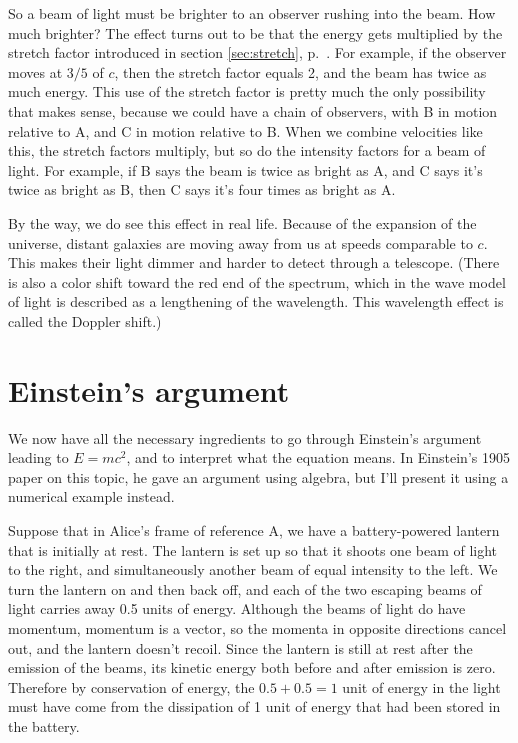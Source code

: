 So a beam of light must be brighter to an observer rushing into the beam. How much brighter?
The effect turns out to be that the energy gets multiplied by the stretch factor introduced
in section \ref{sec:stretch}, p.~\pageref{sec:stretch}. For example, if the observer moves at $3/5$ of
$c$, then the stretch factor equals 2, and the beam has twice as much energy. This use of the stretch
factor is pretty much the only possibility that makes sense, because we could have a chain of observers,
with B in motion relative to A, and C in motion relative to B. When we combine velocities like this,
the stretch factors multiply, but so do the intensity factors for a beam of light. For example, if B
says the beam is twice as bright as A, and C says it's twice as bright as B, then C says it's four
times as bright as A.

By the way, we do see this effect in real life. Because of the expansion of the universe, distant galaxies
are moving away from us at speeds comparable to $c$. This makes their light dimmer and harder to detect
through a telescope. (There is also a color shift toward the red end of the spectrum, which in the wave
model of light is described as a lengthening of the wavelength. This wavelength effect is called the
Doppler shift.)

\section{Einstein's argument}

We now have all the necessary ingredients to go through Einstein's argument leading to $E=mc^2$, and to
interpret what the equation means. In Einstein's 1905 paper on this topic, he gave an argument using algebra,
but I'll present it using a numerical example instead.

Suppose that in Alice's frame of reference A, we have a battery-powered
lantern that is initially at rest. The lantern is set
up so that it shoots one beam of light to the right, and simultaneously another beam of equal intensity to the left.
We turn the lantern on and then back off, and each of the two escaping beams of light carries away 0.5 units
of energy. Although the beams of light do have momentum, momentum is a vector, so the momenta in opposite directions
cancel out, and the lantern doesn't recoil. Since the lantern is still at rest after the emission of the beams, its
kinetic energy both before and after emission is zero. Therefore by conservation of energy, the $0.5+0.5=1$ unit
of energy in the light must have come from the dissipation of 1 unit of energy that had been stored in the battery.


